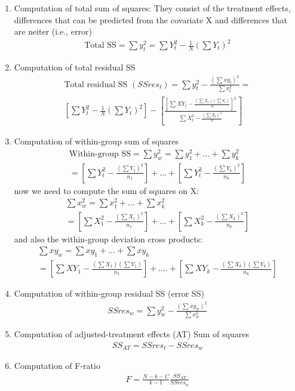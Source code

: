 \documentclass{article}
\begin{document}
\begin{enumerate}
  \item Computation of total sum of squares: They consist of the treatment effects, differences that can be predicted from the covariate X and differences that are neiter (i.e., error) 
  \begin{align}
    \text{Total SS} = \sum{y_t^2} = \sum{Y_t^2} - \frac{1}{N}(\sum{Y_t})^2
  \end{align}
  
  \item Computation of total residual SS 
  \begin{eqnarray*}
  \text{Total residual SS }(SSres_t) = \sum{y_t^2} - \frac{(\sum{xy_t})^2}{\sum{x_t^2}} = \\
  \left[\sum{Y_t^2} - \frac{1}{N}(\sum{Y_t})^2 \right] -
  \left[\frac{\left[\sum{XY_t} -
  \frac{(\sum{X_t})(\sum{Y_t})}{N}\right]^2}{\sum{X_t^2} - \frac{(\sum{X_t})^2}{N}} \right]
  \end{eqnarray*}

  \item Computation of within-group sum of squares 
    \begin{eqnarray*}
    \text{Within-group SS} = \sum{y_w^2} = \sum{y_1^2} + ... + \sum{y_k^2} \\
    = \left[\sum{Y_t^2} - \frac{(\sum{Y_1})^2}{n_1}\right] + ... + \left[\sum{Y_t^2} - \frac{(\sum{Y_k})^2}{n_k}\right] 
    \end{eqnarray*}
  now we need to compute the sum of squares on X: 
  \begin{eqnarray*}
    \sum{x_w^2} = \sum{x_1^2} + ... + \sum{x_k^2} \\
    = \left[ \sum{X_1^2} - 
    \frac{(\sum{X_1})^2}{n_1} \right] + ... + 
    \left[ \sum{X_k^2} - \frac{(\sum{X_k})^2}{n_k} \right]
  \end{eqnarray*}
  and also the within-group deviation cross products: 
  \begin{eqnarray*}
    \sum{xy_w} = \sum{xy_1} + ... + \sum{xy_k} \\
    = \left[ \sum{XY_1} - 
    \frac{(\sum{X_1})(\sum{Y_1})}{n_1}\right] + .... +
    \left[\sum{XY_k} - \frac{(\sum{X_k})(\sum{Y_k})}{n_k}\right]
  \end{eqnarray*}
  
  \item Computation of within-group residual SS (error SS)
  \begin{align*}
  SSres_w = \sum{y_w^2} - \frac{(\sum{xy_w})^2}{\sum{x_w^2}}
  \end{align*}
  
  \item Computation of adjusted-treatment effects (AT) Sum of squares 
  \begin{align*}
  SS_{AT} = SSres_t - SSres_w 
  \end{align*}
  
  \item Computation of F-ratio 
  \begin{align*}
  F = \frac{N-k-C}{k-1}\frac{SS_{AT}}{SSres_w}
  \end{align*}
\end{enumerate}
\end{document}
